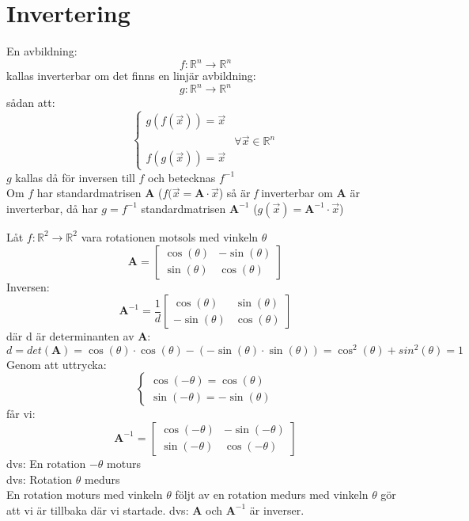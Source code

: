 \section{Invertering} %
\label{sec:invertering}
En avbildning:
\[
    f:\mathbb{R}^n \rightarrow \mathbb{R}^n
\]
kallas inverterbar om det finns en linjär avbildning:
\[
    g:\mathbb{R}^n \rightarrow \mathbb{R}^n
\]
sådan att:
\[
    \begin{cases}
		g(f(\vec{x})) = \vec{x}\\
		&\forall \vec{x} \in \mathbb{R}^n \\
		f(g(\vec{x})) = \vec{x}
	\end{cases}
\]
$g$ kallas då för inversen till $f$ och betecknas $f^{-1}$\\
Om $f$ har standardmatrisen $\mathbf{A}$ ($f(\vec{x} = \mathbf{A} \cdot \vec{x}$) så är \textit{f} inverterbar om \textbf{A} är inverterbar, då har $g=f^{-1}$ standardmatrisen $\mathbf{A}^{-1}$ ($g(\vec{x}) = \mathbf{A}^{-1} \cdot \vec{x}$)

\begin{Ex}
    Låt $f:\mathbb{R}^2 \rightarrow \mathbb{R}^2$ vara rotationen motsols med vinkeln $\theta$
    \[
        \mathbf{A} = \begin{bmatrix} \cos(\theta)&-\sin(\theta)\\\sin(\theta)&\cos(\theta) \end{bmatrix}
    \]
    Inversen:
    \[
        \mathbf{A}^{-1} = \frac{1}{d} \begin{bmatrix} \cos(\theta)&\sin(\theta)\\-\sin(\theta)&\cos(\theta) \end{bmatrix}
    \]
    där d är determinanten av \textbf{A}:
    \[
        d = det(\mathbf{A}) = \cos(\theta) \cdot \cos(\theta) - (-\sin(\theta) \cdot \sin(\theta)) = \cos^2(\theta) + sin^2(\theta) = 1
    \]
    Genom att uttrycka:
    \[
        \begin{cases}
        	\cos(-\theta) = \cos(\theta)\\
        	\sin(-\theta) = -\sin(\theta)
        \end{cases}
    \]
    får vi:
    \[
        \mathbf{A}^{-1} = \begin{bmatrix} \cos(-\theta)&-\sin(-\theta)\\\sin(-\theta)&\cos(-\theta) \end{bmatrix}
    \]
    dvs: En rotation $-\theta$ moturs\\
    dvs: Rotation $\theta$ medurs\\
    En rotation moturs med vinkeln $\theta$ följt av en rotation medurs med vinkeln $\theta$ gör att vi är tillbaka där vi startade.
    dvs: \textbf{A} och $\mathbf{A}^{-1}$ är inverser.
\end{Ex}
